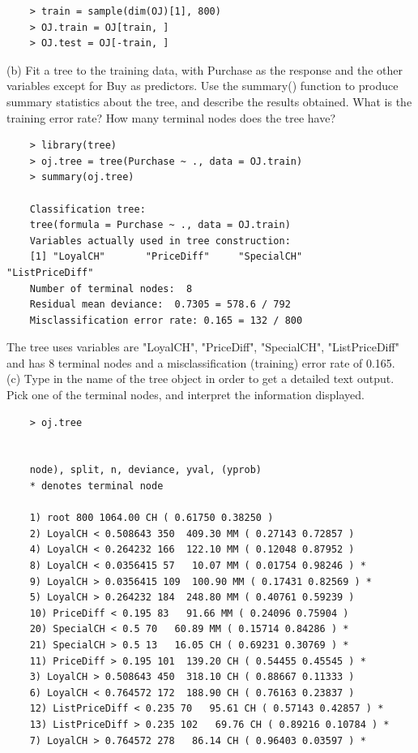 \documentclass{article}
\begin{document}
\begin{program}
	\begin{verbatim}
	> train = sample(dim(OJ)[1], 800)
	> OJ.train = OJ[train, ]
	> OJ.test = OJ[-train, ]
	\end{verbatim}
\end{program}


\newpage

(b) Fit a tree to the training data, with Purchase as the response and the other variables except for Buy as predictors. Use the summary() function to produce summary statistics about the tree, and describe the results obtained. What is the training error rate? How many terminal nodes does the tree have?\\

\begin{program}
	\begin{verbatim}
	> library(tree)
	> oj.tree = tree(Purchase ~ ., data = OJ.train)
	> summary(oj.tree)
	
	Classification tree:
	tree(formula = Purchase ~ ., data = OJ.train)
	Variables actually used in tree construction:
	[1] "LoyalCH"       "PriceDiff"     "SpecialCH"     "ListPriceDiff"
	Number of terminal nodes:  8 
	Residual mean deviance:  0.7305 = 578.6 / 792 
	Misclassification error rate: 0.165 = 132 / 800 
	\end{verbatim}
\end{program}

The tree uses variables  are  "LoyalCH", "PriceDiff",  "SpecialCH", "ListPriceDiff" and  has 8 terminal nodes and a misclassification (training) error rate of 0.165.\\

(c) Type in the name of the tree object in order to get a detailed text output. Pick one of the terminal nodes, and interpret the information displayed.\\

\begin{program}
	\begin{verbatim}
	> oj.tree
	
	
	node), split, n, deviance, yval, (yprob)
	* denotes terminal node
	
	1) root 800 1064.00 CH ( 0.61750 0.38250 )  
	2) LoyalCH < 0.508643 350  409.30 MM ( 0.27143 0.72857 )  
	4) LoyalCH < 0.264232 166  122.10 MM ( 0.12048 0.87952 )  
	8) LoyalCH < 0.0356415 57   10.07 MM ( 0.01754 0.98246 ) *
	9) LoyalCH > 0.0356415 109  100.90 MM ( 0.17431 0.82569 ) *
	5) LoyalCH > 0.264232 184  248.80 MM ( 0.40761 0.59239 )  
	10) PriceDiff < 0.195 83   91.66 MM ( 0.24096 0.75904 )  
	20) SpecialCH < 0.5 70   60.89 MM ( 0.15714 0.84286 ) *
	21) SpecialCH > 0.5 13   16.05 CH ( 0.69231 0.30769 ) *
	11) PriceDiff > 0.195 101  139.20 CH ( 0.54455 0.45545 ) *
	3) LoyalCH > 0.508643 450  318.10 CH ( 0.88667 0.11333 )  
	6) LoyalCH < 0.764572 172  188.90 CH ( 0.76163 0.23837 )  
	12) ListPriceDiff < 0.235 70   95.61 CH ( 0.57143 0.42857 ) *
	13) ListPriceDiff > 0.235 102   69.76 CH ( 0.89216 0.10784 ) *
	7) LoyalCH > 0.764572 278   86.14 CH ( 0.96403 0.03597 ) *
	\end{verbatim}
\end{program}
\end{document}
